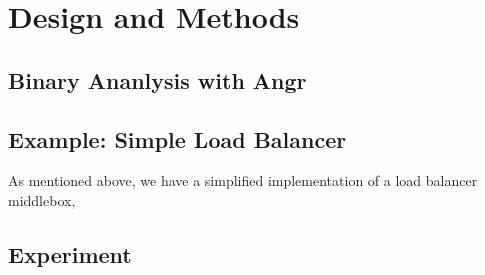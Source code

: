 \section{Design and Methods}

\subsection{Binary Ananlysis with Angr}


\subsection{Example: Simple Load Balancer}

As mentioned above, we have a simplified implementation of a load balancer
middlebox,


\subsection{Experiment}


